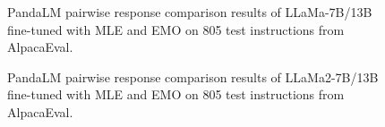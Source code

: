 \begin{figure}[h]
    \centering
    \caption{PandaLM pairwise response comparison results of LLaMa-7B/13B fine-tuned with MLE and EMO on 805 test instructions from AlpacaEval.}
    \label{fig:pandalm_llama1}
\end{figure}
\begin{figure}[h]
    \centering
    \caption{PandaLM pairwise response comparison results of LLaMa2-7B/13B fine-tuned with MLE and EMO on 805 test instructions from AlpacaEval.}
    \label{fig:pandalm_llama2}
\end{figure}
